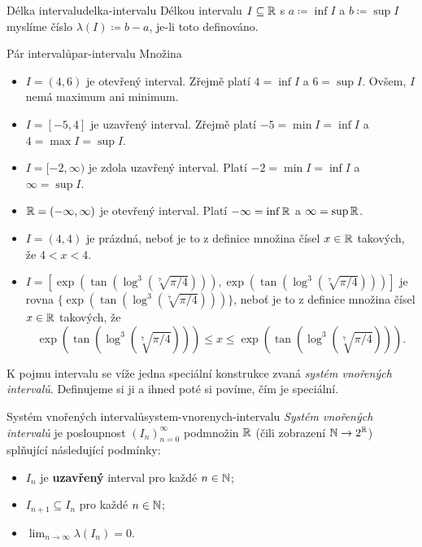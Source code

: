 \begin{definition}{Délka intervalu}{delka-intervalu}
 Délkou intervalu $I \subseteq \mathbb{R}$ s $a \coloneqq \inf I$ a $b \coloneqq \sup I$
 myslíme číslo $\lambda(I) \coloneqq b - a$, je-li toto definováno.
\end{definition}

\begin{example}{Pár intervalů}{par-intervalu}
 Množina
 \begin{itemize}
  \item $I = (4,6)$ je otevřený interval. Zřejmě platí $4 = \inf I$ a $6 = \sup
   I$. Ovšem, $I$ nemá maximum ani minimum.
  \item $I = [-5,4]$ je uzavřený interval. Zřejmě platí $-5 = \min I = \inf I$ a
   $4 = \max I = \sup I$.
  \item $I = [-2,\infty)$ je zdola uzavřený interval. Platí $-2 = \min I = \inf
   I$ a $\infty = \sup I$.
  \item $\mathbb{R} = (-\infty,\infty)$ je otevřený interval. Platí $-\infty = \inf \mathbb{R}$
   a $\infty = \sup \mathbb{R}$.
  \item $I = (4,4)$ je prázdná, neboť je to z definice množina čísel $x \in \mathbb{R}$
   takových, že $4 < x < 4$.
  \item $I = [\exp(\tan(\log^{3}(\sqrt[7]{\pi /
   4}))),\exp(\tan(\log^{3}(\sqrt[7]{\pi / 4})))]$ je rovna
   $\{\exp(\tan(\log^{3}(\sqrt[7]{\pi / 4})))\}$, neboť je to z definice množina
   čísel $x \in \mathbb{R}$ takových, že
   \[
    \exp(\tan(\log^{3}(\sqrt[7]{\pi / 4}))) \leq x \leq
    \exp(\tan(\log^{3}(\sqrt[7]{\pi / 4}))).
   \]
 \end{itemize}
\end{example}

K pojmu intervalu se víže jedna speciální konstrukce zvaná \emph{systém
vnořených intervalů}. Definujeme si ji a ihned poté si povíme, čím je speciální.

\begin{definition}{Systém vnořených intervalů}{system-vnorenych-intervalu}
 \emph{Systém vnořených intervalů} je posloupnost $(I_n)_{n=0}^{\infty}$
 podmnožin $\mathbb{R}$ (čili zobrazení $\mathbb{N} \to 2^{\mathbb{R}}$) splňující následující podmínky:
 \begin{itemize}
  \item $I_n$ je \textbf{uzavřený} interval pro každé $n \in \mathbb{N}$;
  \item $I_{n+1} \subseteq I_n$ pro každé $n \in \mathbb{N}$;
  \item $\lim_{n \to \infty} \lambda(I_n) = 0$.
 \end{itemize}
\end{definition}

